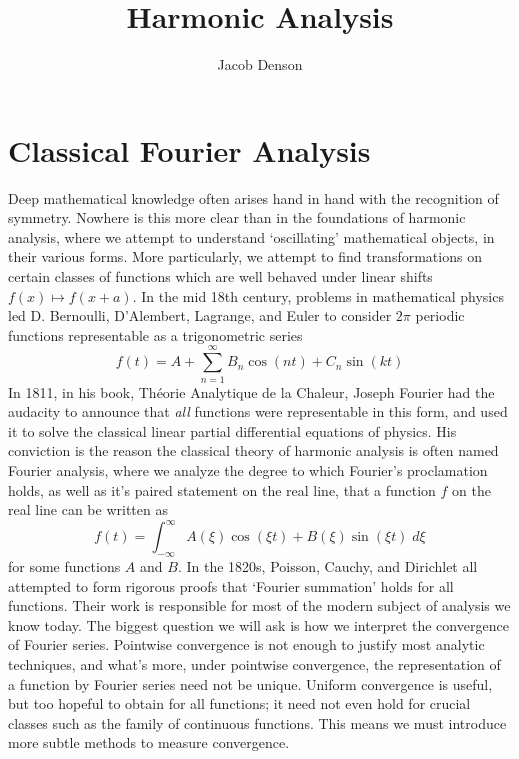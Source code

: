 

\DeclareMathOperator{\Dom}{Dom}

\title{Harmonic Analysis}
\author{Jacob Denson}




\maketitle

\tableofcontents


\part{Classical Fourier Analysis}

Deep mathematical knowledge often arises hand in hand with the recognition of symmetry. Nowhere is this more clear than in the foundations of harmonic analysis, where we attempt to understand `oscillating' mathematical objects, in their various forms. More particularly, we attempt to find transformations on certain classes of functions which are well behaved under linear shifts $f(x) \mapsto f(x + a)$. In the mid 18th century, problems in mathematical physics led D. Bernoulli, D'Alembert, Lagrange, and Euler to consider $2 \pi$ periodic functions representable as a trigonometric series
%
\[ f(t) = A + \sum_{n = 1}^\infty B_n \cos(nt) + C_n \sin(kt) \]
%
In 1811, in his book, Th\'{e}orie Analytique de la Chaleur, Joseph Fourier had the audacity to announce that {\it all} functions were representable in this form, and used it to solve the classical linear partial differential equations of physics. His conviction is the reason the classical theory of harmonic analysis is often named Fourier analysis, where we analyze the degree to which Fourier's proclamation holds, as well as it's paired statement on the real line, that a function $f$ on the real line can be written as
%
\[ f(t) = \int_{-\infty}^\infty A(\xi) \cos(\xi t) + B(\xi) \sin(\xi t)\; d\xi \]
%
for some functions $A$ and $B$. In the 1820s, Poisson, Cauchy, and Dirichlet all attempted to form rigorous proofs that `Fourier summation' holds for all functions. Their work is responsible for most of the modern subject of analysis we know today. The biggest question we will ask is how we interpret the convergence of Fourier series. Pointwise convergence is not enough to justify most analytic techniques, and what's more, under pointwise convergence, the representation of a function by Fourier series need not be unique. Uniform convergence is useful, but too hopeful to obtain for all functions; it need not even hold for crucial classes such as the family of continuous functions. This means we must introduce more subtle methods to measure convergence.

